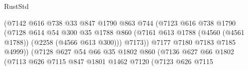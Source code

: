 \begin{lexlean}{RustStd}
\begin{coremodule}
                                          (@7142
                                            @616
                                            @738
                                            @33
                                            @847
                                            @1790
                                            @863
                                            @744
                                            (@7123
                                              @616
                                              @738
                                              @1790
                                              (@7128
                                                @614
                                                @54
                                                @300
                                                @35
                                                @1788
                                                @860
                                                (@7161
                                                  @613
                                                  @1788
                                                  (@4560 (@4561 @1788))
                                                  (@2258 (@4566 @613 @300)))
                                                @7173))
                                            @7177
                                            @7180
                                            @7183
                                            @7185
                                            @4999))
                                        (@7128
                                          @627
                                          @54
                                          @66
                                          @35
                                          @1802
                                          @860
                                          (@7136
                                            @627
                                            @66
                                            @1802
                                            (@7113
                                              @626
                                              @7115
                                              @847
                                              @1801
                                              @1462
                                              @7120
                                              (@7123
                                                @626
                                                @7115

\end{coremodule}
\end{lexlean}

